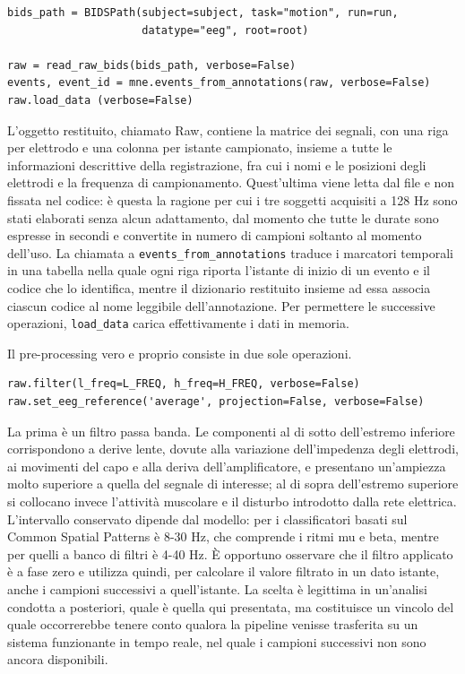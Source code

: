 \begin{lstlisting}
bids_path = BIDSPath(subject=subject, task="motion", run=run,
                     datatype="eeg", root=root)

raw = read_raw_bids(bids_path, verbose=False)
events, event_id = mne.events_from_annotations(raw, verbose=False)
raw.load_data (verbose=False)
\end{lstlisting}

L’oggetto restituito, chiamato Raw, contiene la matrice dei segnali, con una riga per elettrodo e una colonna per istante campionato, insieme a tutte le informazioni descrittive della registrazione, fra cui i nomi e le posizioni degli elettrodi e la frequenza di campionamento. Quest’ultima viene letta dal file e non fissata nel codice: è questa la ragione per cui i tre soggetti acquisiti a 128 Hz sono stati elaborati senza alcun adattamento, dal momento che tutte le durate sono espresse in secondi e convertite in numero di campioni soltanto al momento dell’uso.
La chiamata a \texttt{events\_from\_annotations} traduce i marcatori temporali in una tabella nella quale ogni riga riporta l’istante di inizio di un evento e il codice che lo identifica, mentre il dizionario restituito insieme ad essa associa ciascun codice al nome leggibile dell’annotazione. Per permettere le successive operazioni, \texttt{load\_data} carica effettivamente i dati in memoria.

Il pre-processing vero e proprio consiste in due sole operazioni.

\begin{lstlisting}
raw.filter(l_freq=L_FREQ, h_freq=H_FREQ, verbose=False)
raw.set_eeg_reference('average', projection=False, verbose=False)
\end{lstlisting}

La prima è un filtro passa banda. Le componenti al di sotto dell’estremo inferiore corrispondono a derive lente, dovute alla variazione dell’impedenza degli elettrodi, ai movimenti del capo e alla deriva dell’amplificatore, e presentano un’ampiezza molto superiore a quella del segnale di interesse; al di sopra dell’estremo superiore si collocano invece l’attività muscolare e il disturbo introdotto dalla rete elettrica. L’intervallo conservato dipende dal modello: per i classificatori basati sul Common Spatial Patterns è 8-30 Hz, che comprende i ritmi mu e beta, mentre per quelli a banco di filtri è 4-40 Hz. È opportuno osservare che il filtro applicato è a fase zero e utilizza quindi, per calcolare il valore filtrato in un dato istante, anche i campioni successivi a quell’istante. La scelta è legittima in un’analisi condotta a posteriori, quale è quella qui presentata, ma costituisce un vincolo del quale occorrerebbe tenere conto qualora la pipeline venisse trasferita su un sistema funzionante in tempo reale, nel quale i campioni successivi non sono ancora disponibili.

